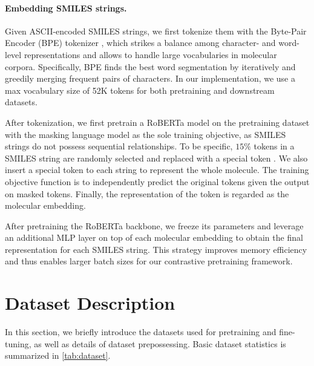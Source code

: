 \paragraph{Embedding SMILES strings.}
Given ASCII-encoded SMILES strings, we first tokenize them with the Byte-Pair Encoder (BPE) tokenizer \cite{Gage:1994}, which strikes a balance among character- and word-level representations and allows to handle large vocabularies in molecular corpora.
Specifically, BPE finds the best word segmentation by iteratively and greedily merging frequent pairs of characters. In our implementation, we use a max vocabulary size of 52K tokens for both pretraining and downstream datasets.

After tokenization, we first pretrain a RoBERTa \cite{Liu:2019dd} model on the pretraining dataset with the masking language model as the sole training objective, as SMILES strings do not possess sequential relationships.
To be specific, $15\%$ tokens in a SMILES string are randomly selected and replaced with a special token .
We also insert a special token  to each string to represent the whole molecule.
The training objective function is to independently predict the original tokens given the output on masked tokens.
Finally, the representation of the  token is regarded as the molecular embedding.

After pretraining the RoBERTa backbone, we freeze its parameters and leverage an additional MLP layer on top of each molecular embedding to obtain the final representation for each SMILES string.
This strategy improves memory efficiency and thus enables larger batch sizes for our contrastive pretraining framework.

\section{Dataset Description}
\label{supp:dataset}

In this section, we briefly introduce the datasets used for pretraining and fine-tuning, as well as details of dataset prepossessing.
Basic dataset statistics is summarized in \cref{tab:dataset}.

